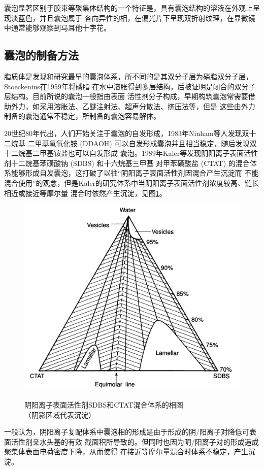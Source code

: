 \documentclass[bachelor,fandolfonts,replaceperiod]{jnuthesis}
\begin{document}
    囊泡显著区别于胶束等聚集体结构的一个特征是，具有囊泡结构的溶液在外观上呈现淡蓝色，并且囊泡属于
    各向异性的相，在偏光片下呈现双折射纹理，在显微镜中通常能够观察到马耳他十字花\cite{刘洪国2016}。
        
    \subsection{囊泡的制备方法}
    脂质体是发现和研究最早的囊泡体系，所不同的是其双分子层为磷脂双分子层，Stoeckenius在1959年将磷脂
    在水中溶胀得到多层结构\cite{刘洪国2016}，后被证明是闭合的双分子层结构。目前所说的囊泡一般指由表面
    活性剂分子构成，早期构筑囊泡常需要借助外力，如采用溶胀法、乙醚注射法、超声分散法、挤压法等，但是
    这些由外力制备的囊泡通常不稳定，所制备的囊泡容易解体\cite{刘洪国2016}。
    
    20世纪80年代出，人们开始关注于囊泡的自发形成，1983年Ninham等人\cite{ninham1983}发现双十二烷基
    二甲基氢氧化铵 (DDAOH) 可以自发形成囊泡并且相当稳定，随后发现双十二烷基二甲基铵盐也可以自发形成
    囊泡。1989年Kaler等\cite{kaler1989}发现阴阳离子表面活性剂十二烷基苯磺酸钠 (SDBS) 和十六烷基三甲基
    对甲苯磺酸盐 (CTAT) 的混合体系能够形成自发囊泡，这打破了以往“阴阳离子表面活性剂因混合产生沉淀而
    不能混合使用”的观念，但是Kaler的研究体系中当阴阳离子表面活性剂浓度较高、链长相近或接近等摩尔量
    混合时依然产生沉淀，见图\ref{fig:vesicle-phase}。    
    \begin{figure}[htbp]
        \centering
        \includegraphics[width= .526\textwidth]{figure/vesicle-phase.png}\\
        \caption{阴阳离子表面活性剂SDBS和CTAT混合体系的相图\cite{kaler1989}\\{\footnotesize{（阴影区域代表沉淀）}}}
        \label{fig:vesicle-phase}
    \end{figure}

    一般认为，阴阳离子复配体系中囊泡相的形成是由于形成的阴/阳离子对降低可表面活性剂亲水头基的有效
    截面积所导致的\cite{刘洪国2016}。但同时也因为阴/阳离子对的形成造成聚集体表面电荷密度下降，从而使得
    在接近等摩尔量混合时体系不稳定，产生沉淀。
    
\end{document}
